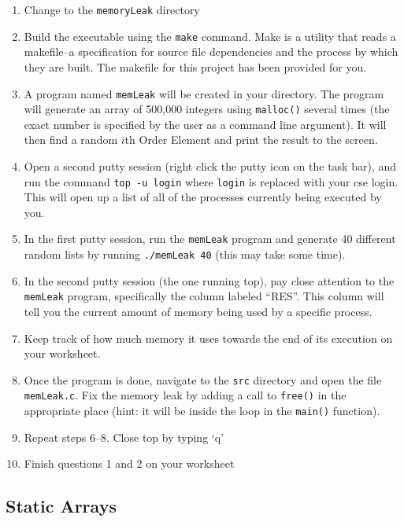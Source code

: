 \documentclass[12pt]{scrartcl}
\begin{document}
\begin{enumerate}
  \item Change to the \texttt{memoryLeak} directory
  \item Build the executable using the \texttt{make} command.  
  	Make is a utility that reads a makefile--a specification for source file 
	dependencies and the process by which they are built.  The makefile 
	for this project has been provided for you.
  \item A program named \texttt{memLeak} will be created in your 
	directory.  The program will generate an array of 500,000 integers 
	using \texttt{malloc()} several times (the exact number is specified 
	by the user as a command line argument).  It will then find a random 
	$i$th Order Element and print the result to the screen.  
  \item Open a second putty session (right click the putty icon on the task bar), 
	and run the command \texttt{top -u login} where \texttt{login}
	is replaced with your cse login.  This will open up a list of all of the 
	processes currently being executed by you.  
  \item In the first putty session, run the \texttt{memLeak} program 
	and generate 40 different random lists by running \texttt{./memLeak 40}
	(this may take some time).  
  \item In the second putty session (the one running top), pay close attention 
	to the \texttt{memLeak} program, specifically the column labeled ``RES''.  
	This column will tell you the current amount of memory being used by a 
	specific process.  
  \item Keep track of how much memory it uses towards the end of its 
	execution on your worksheet.  
  \item Once the program is done, navigate to the \texttt{src} 
	directory and open the file \texttt{memLeak.c}.  Fix the memory 
	leak by adding a call to \texttt{free()} in the appropriate place 
	(hint: it will be inside the loop in the \texttt{main()} function).  
  \item Repeat steps 6--8.  Close top by typing `q'
  \item Finish questions 1 and 2 on your worksheet
\end{enumerate}
  
\subsection{Static Arrays}
\end{document}
